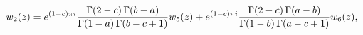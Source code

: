 \[w_{2}(z)=e^{(1-c)\pi i}\frac{\mathop{\Gamma\/}\nolimits\!\left(2-c\right)%
\mathop{\Gamma\/}\nolimits\!\left(b-a\right)}{\mathop{\Gamma\/}\nolimits\!%
\left(1-a\right)\mathop{\Gamma\/}\nolimits\!\left(b-c+1\right)}w_{5}(z)+e^{(1-%
c)\pi i}\frac{\mathop{\Gamma\/}\nolimits\!\left(2-c\right)\mathop{\Gamma\/}%
\nolimits\!\left(a-b\right)}{\mathop{\Gamma\/}\nolimits\!\left(1-b\right)%
\mathop{\Gamma\/}\nolimits\!\left(a-c+1\right)}w_{6}(z),\]